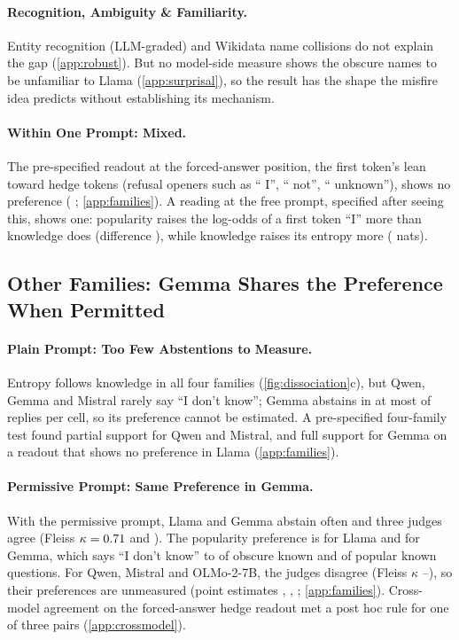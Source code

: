\documentclass{article}
\newcommand{\idk}{``I don't know''}
\begin{document}
\paragraph{Recognition, Ambiguity \& Familiarity.} Entity recognition (LLM-graded) and Wikidata name collisions do not explain the gap (\cref{app:robust}). But no model-side measure shows the obscure names to be unfamiliar to Llama (\cref{app:surprisal}), so the result has the shape the misfire idea predicts without establishing its mechanism.

\paragraph{Within One Prompt: Mixed.} The pre-specified readout at the forced-answer position, the first token's lean toward hedge tokens (refusal openers such as `` I'', `` not'', `` unknown''), shows no preference (\loLlamaDiff{} \loLlamaDiffCI; \cref{app:families}). A reading at the free prompt, specified after seeing this, shows one: popularity raises the log-odds of a first token ``I'' more than knowledge does (difference \eoFreeIDiff{} \eoFreeIDiffCI), while knowledge raises its entropy more (\eoFreeEntDiff{} \eoFreeEntDiffCI{} nats).

\subsection{Other Families: Gemma Shares the Preference When Permitted}
\label{sec:families}

\paragraph{Plain Prompt: Too Few Abstentions to Measure.} Entropy follows knowledge in all four families (\cref{fig:dissociation}c), but Qwen, Gemma and Mistral rarely say \idk; Gemma abstains in at most \tjGemmaObsUnk{} of replies per cell, so its preference cannot be estimated. A pre-specified four-family test found partial support for Qwen and Mistral, and full support for Gemma on a readout that shows no preference in Llama (\cref{app:families}).

\paragraph{Permissive Prompt: Same Preference in Gemma.} With the permissive prompt, Llama and Gemma abstain often and three judges agree (Fleiss $\kappa=0.71$ and \pmGemmaKappa). The popularity preference is \pmLlamaDiff{} \pmLlamaDiffCI{} for Llama and \pmGemmaDiff{} \pmGemmaDiffCI{} for Gemma, which says \idk{} to \pmGemmaObsKnown{} of obscure known and \pmGemmaPopKnown{} of popular known questions. For Qwen, Mistral and OLMo-2-7B, the judges disagree (Fleiss $\kappa$ \pmQwenKappa--\pmMistralKappa), so their preferences are unmeasured (point estimates \pmQwenDiff, \pmMistralDiff, \pmOlmoDiff; \cref{app:families}). Cross-model agreement on the forced-answer hedge readout met a post hoc rule for one of three pairs (\cref{app:crossmodel}).
\end{document}
